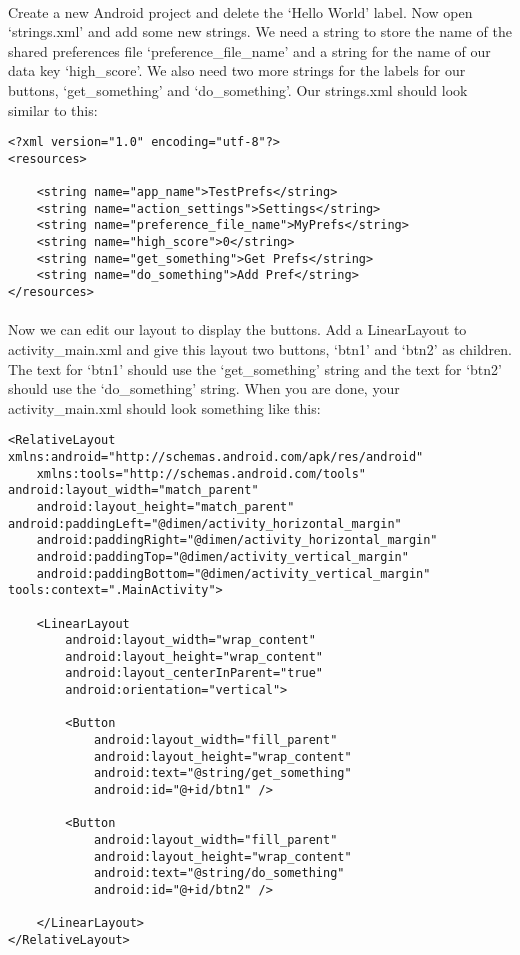 \paragraph{} Create a new Android project and delete the `Hello World' label. Now open `strings.xml' and add some new strings. We need a string to store the name of the shared preferences file `preference\_file\_name' and a string for the name of our data key `high\_score'. We also need two more strings for the labels for our buttons, `get\_something' and `do\_something'. Our strings.xml should look similar to this:

\begin{lstlisting}
<?xml version="1.0" encoding="utf-8"?>
<resources>

    <string name="app_name">TestPrefs</string>
    <string name="action_settings">Settings</string>
    <string name="preference_file_name">MyPrefs</string>
    <string name="high_score">0</string>
    <string name="get_something">Get Prefs</string>
    <string name="do_something">Add Pref</string>
</resources>
\end{lstlisting}

\paragraph{} Now we can edit our layout to display the buttons. Add a LinearLayout to activity\_main.xml and give this layout two buttons, `btn1' and `btn2' as children. The text for `btn1' should use the `get\_something' string and the text for `btn2' should use the `do\_something' string. When you are done, your activity\_main.xml should look something like this:

\begin{lstlisting}
<RelativeLayout xmlns:android="http://schemas.android.com/apk/res/android"
    xmlns:tools="http://schemas.android.com/tools" android:layout_width="match_parent"
    android:layout_height="match_parent" android:paddingLeft="@dimen/activity_horizontal_margin"
    android:paddingRight="@dimen/activity_horizontal_margin"
    android:paddingTop="@dimen/activity_vertical_margin"
    android:paddingBottom="@dimen/activity_vertical_margin" tools:context=".MainActivity">

    <LinearLayout
        android:layout_width="wrap_content"
        android:layout_height="wrap_content"
        android:layout_centerInParent="true"
        android:orientation="vertical">

        <Button
            android:layout_width="fill_parent"
            android:layout_height="wrap_content"
            android:text="@string/get_something"
            android:id="@+id/btn1" />

        <Button
            android:layout_width="fill_parent"
            android:layout_height="wrap_content"
            android:text="@string/do_something"
            android:id="@+id/btn2" />

    </LinearLayout>
</RelativeLayout>
\end{lstlisting}

